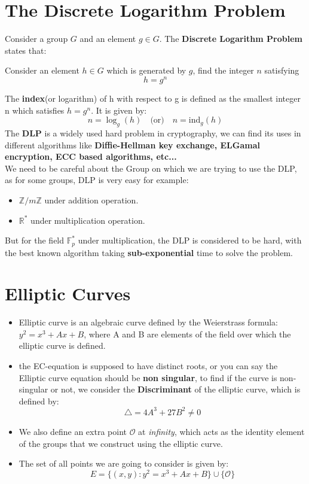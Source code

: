 \documentclass[12pt,a4paper]{report}
\begin{document}
\section{The Discrete Logarithm Problem}
Consider a group $G$ and an element $g \in G$. The \textbf{Discrete Logarithm Problem} states that: 
\begin{boxC}
Consider an element $h \in G$ which is generated by $g$, find the integer $n$ satisfying
\[
h = g^n
\]
\end{boxC}

The \textbf{index}(or logarithm) of h with respect to g is defined as the smallest integer n which satisfies \(h = g^n\). It is given by:
\[
n = \log_g{(h)} \quad \text{(or)} \quad n = \text{ind}_g(h)
\]
The \textbf{DLP} is a widely used hard problem in cryptography, we can find its uses in different algorithms like \textbf{Diffie-Hellman key exchange, ELGamal encryption, ECC based algorithms, etc...}\\
We need to be careful about the Group on which we are trying to use the DLP, as for some groups, DLP is very easy for example:
\begin{itemize}
    \item $\mathbb{Z}/m\mathbb{Z}$ under addition operation.
    \item $\mathbb{R}^*$ under multiplication operation.
\end{itemize}
But for the field $\mathbb{F}_p^*$ under multiplication, the DLP is considered to be hard, with the best known algorithm taking \textbf{sub-exponential} time to solve the problem.
\section{Elliptic Curves}
\begin{itemize}
    \item Elliptic curve is an algebraic curve defined by the Weierstrass formula: $y^2 = x^3 + Ax + B$, where A and B are elements of the field over which the elliptic curve is defined.
    \item the EC-equation is supposed to have distinct roots, or you can say the Elliptic curve equation should be \textbf{non singular}, to find if the curve is non-singular or not, we consider the \textbf{Discriminant} of the elliptic curve, which is defined by:
    \[
    \triangle = 4A^3 + 27B^2 \neq 0
    \]
    \item We also define an extra point $\mathcal{O}$ at \textit{infinity}, which acts as the identity element of the groups that we construct using the elliptic curve.
    \item The set of all points we are going to consider is given by:
    \[
    E = \{(x,y) : y^2 = x^3 + Ax+B\} \cup \{\mathcal{O\}}
    \]
\end{itemize}
\end{document}
